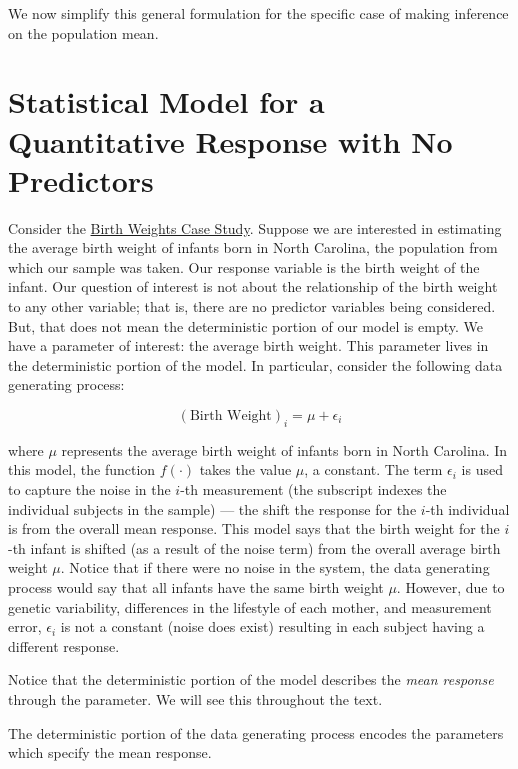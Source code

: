 \documentclass[]{book}
\theoremstyle{plain}
\theoremstyle{mydefn}
\theoremstyle{myexmpl}
\theoremstyle{remark}
\let\BeginKnitrBlock\begin \let\EndKnitrBlock\end
\let\BeginKnitrBlock\begin \let\EndKnitrBlock\end
\begin{document}
We now simplify this general formulation for the specific case of making
inference on the population mean.

\section{Statistical Model for a Quantitative Response with No
Predictors}\label{statistical-model-for-a-quantitative-response-with-no-predictors}

Consider the \protect\hyperlink{CaseBabies}{Birth Weights Case Study}.
Suppose we are interested in estimating the average birth weight of
infants born in North Carolina, the population from which our sample was
taken. Our response variable is the birth weight of the infant. Our
question of interest is not about the relationship of the birth weight
to any other variable; that is, there are no predictor variables being
considered. But, that does not mean the deterministic portion of our
model is empty. We have a parameter of interest: the average birth
weight. This parameter lives in the deterministic portion of the model.
In particular, consider the following data generating process:

\[(\text{Birth Weight})_i = \mu + \epsilon_i\]

where \(\mu\) represents the average birth weight of infants born in
North Carolina. In this model, the function \(f(\cdot)\) takes the value
\(\mu\), a constant. The term \(\epsilon_i\) is used to capture the
noise in the \(i\)-th measurement (the subscript indexes the individual
subjects in the sample) --- the shift the response for the \(i\)-th
individual is from the overall mean response. This model says that the
birth weight for the \(i\)-th infant is shifted (as a result of the
noise term) from the overall average birth weight \(\mu\). Notice that
if there were no noise in the system, the data generating process would
say that all infants have the same birth weight \(\mu\). However, due to
genetic variability, differences in the lifestyle of each mother, and
measurement error, \(\epsilon_i\) is not a constant (noise does exist)
resulting in each subject having a different response.

Notice that the deterministic portion of the model describes the
\emph{mean response} through the parameter. We will see this throughout
the text.

\BeginKnitrBlock{rmdtip}
The deterministic portion of the data generating process encodes the
parameters which specify the mean response.
\EndKnitrBlock{rmdtip}
\end{document}
